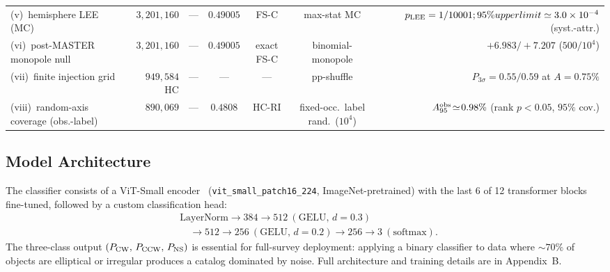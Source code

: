 \documentclass[twocolumn,linenumbers]{aastex702}
\newcommand{\pcw}{P_{\rm CW}}
\newcommand{\pccw}{P_{\rm CCW}}
\newcommand{\pns}{P_{\rm NS}}
\newcommand{\vit}{ViT-Small}
\newcommand{\HCRI}{\textsc{HC-RI}}
\newcommand{\FSC}{\textsc{FS-C}}
\begin{document}
\begin{table}[t]
{\begin{tabular}{lrrcccr}
(v)~hemisphere LEE (MC) & $3{,}201{,}160$ & --- & $0.49005$ & \FSC{} & max-stat MC & $p_{\rm LEE}=1/10001; 95\% upper limit \simeq3.0\times10^{-4}$ (syst.-attr.) \\
(vi)~post-MASTER monopole null & $3{,}201{,}160$ & --- & $0.49005$ & exact \FSC{} & binomial-monopole & $+6.983/+7.207$ ($500/10^4$) \\
(vii)~finite injection grid & $949{,}584$ HC & --- & --- & --- & pp-shuffle & $P_{3\sigma}=0.55/0.59$ at $A\!=\!0.75\%$ \\
(viii)~random-axis coverage (obs.-label) & $890{,}069$ & --- & $0.4808$ & \HCRI{} & fixed-occ.\ label rand.\ ($10^4$) & $A_{95}^{\rm obs}\!\simeq\!0.98\%$ (rank $p\!<\!0.05$, $95\%$ cov.) \\
\end{tabular}
}
\end{table}

\subsection{Model Architecture}
\label{sec:architecture}

The classifier consists of a \vit{} encoder~\cite{Dosovitskiy:2020} (\texttt{vit\_small\_patch16\_224}, ImageNet-pretrained) with the last 6 of 12 transformer blocks fine-tuned, followed by a custom classification head:
\begin{equation}
\begin{aligned}
&\text{LayerNorm} \to 384{\to}512~(\text{GELU},\,d{=}0.3) \\
&\quad \to 512{\to}256~(\text{GELU},\,d{=}0.2) \to 256{\to}3~(\text{softmax}).
\end{aligned}
\end{equation}
The three-class output $(\pcw,\,\pccw,\,\pns)$ is essential for full-survey deployment: applying a binary classifier to data where $\sim\!70\%$ of objects are elliptical or irregular produces a catalog dominated by noise. Full architecture and training details are in Appendix~B.
\end{document}
